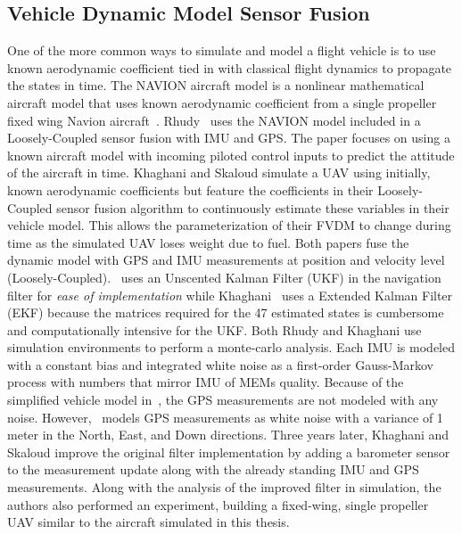 \subsection{\textbf{Vehicle Dynamic Model Sensor Fusion}}
One of the more common ways to simulate and model a flight vehicle is to use known aerodynamic coefficient tied in with classical flight dynamics to propagate the states in time. The NAVION aircraft model is a nonlinear mathematical aircraft model that uses known aerodynamic coefficient from a single propeller fixed wing Navion aircraft~\cite{nelsonFlightStabilityAutomatic1998}. Rhudy~\cite{rhudyDynamicModelaidedSensor2017} uses the NAVION model included in a Loosely-Coupled sensor fusion with IMU and GPS\@. The paper focuses on using a known aircraft model with incoming piloted control inputs to predict the attitude of the aircraft in time. Khaghani and Skaloud simulate a UAV using initially, known aerodynamic coefficients but feature the coefficients in their Loosely-Coupled sensor fusion algorithm to continuously estimate these variables in their vehicle model. This allows the parameterization of their FVDM to change during time as the simulated UAV loses weight due to fuel. Both papers fuse the dynamic model with GPS and IMU measurements at position and velocity level (Loosely-Coupled).~\cite{rhudyDynamicModelaidedSensor2017} uses an Unscented Kalman Filter (UKF) in the navigation filter for \textit{ease of implementation} while Khaghani~\cite{khaghaniAutonomousVehicleDynamic2016,khaghaniAssessmentVDMbasedAutonomous2018} uses a Extended Kalman Filter (EKF) because the matrices required for the 47 estimated states is cumbersome and computationally intensive for the UKF\@. Both Rhudy and Khaghani use simulation environments to perform a monte-carlo analysis. Each IMU is modeled with a constant bias and integrated white noise as a first-order Gauss-Markov process with numbers that mirror IMU of MEMs quality. Because of the simplified vehicle model in~\cite{rhudyDynamicModelaidedSensor2017}, the GPS measurements are not modeled with any noise. However,~\cite{khaghaniAutonomousVehicleDynamic2016} models GPS measurements as white noise with a variance of 1 meter in the North, East, and Down directions. Three years later, Khaghani and Skaloud improve the original filter implementation by adding a barometer sensor to the measurement update along with the already standing IMU and GPS measurements. Along with the analysis of the improved filter in simulation, the authors also performed an experiment, building a fixed-wing, single propeller UAV similar to the aircraft simulated in this thesis.

